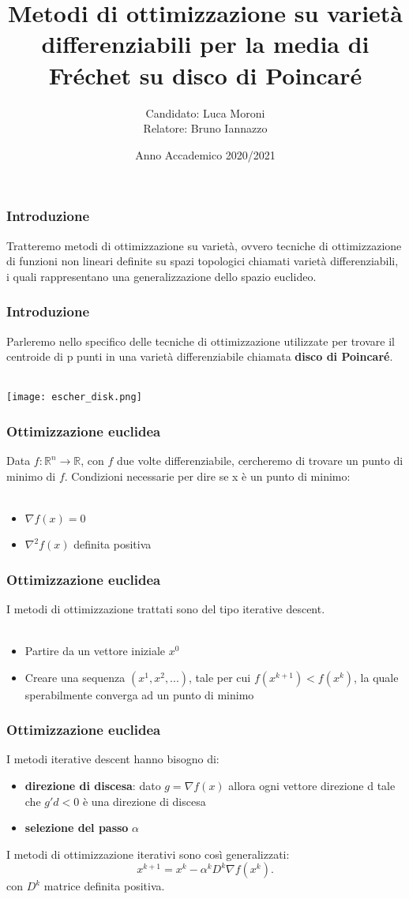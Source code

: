 \documentclass{beamer}
\title{Metodi di ottimizzazione su varietà differenziabili per la media di Fréchet su disco di Poincaré}
\author{\texorpdfstring{Candidato: Luca Moroni\\Relatore: Bruno Iannazzo}{Candidato}}
\institute{Tesi Informatica}
\date{Anno Accademico 2020/2021}
\begin{document}
\frame{\titlepage}

\begin{frame}
\frametitle{Introduzione}
Tratteremo metodi di ottimizzazione su varietà, ovvero tecniche di ottimizzazione di funzioni non lineari definite su spazi topologici chiamati varietà differenziabili, i quali rappresentano una generalizzazione dello spazio euclideo.
\end{frame}

\begin{frame}
\frametitle{Introduzione}
Parleremo nello specifico delle tecniche di ottimizzazione utilizzate per trovare il centroide di p punti in una varietà differenziabile chiamata \textbf{disco di Poincaré}.\\~\
\begin{center}
    \texttt{[image: escher\_disk.png]} 
\end{center}
\end{frame}

\begin{frame}
\frametitle{Ottimizzazione euclidea}
Data $f : \mathbb{R}^n \to \mathbb{R}$, con $f$ due volte differenziabile, cercheremo di trovare un punto di minimo di $f$.
Condizioni necessarie per dire se x è un punto di minimo:\\~\

\begin{itemize}
\item $\nabla f(x) = 0$
\item $\nabla^2 f(x)$ definita positiva
\end{itemize}
\end{frame}

\begin{frame}
\frametitle{Ottimizzazione euclidea}
I metodi di ottimizzazione trattati sono del tipo iterative descent.\\~\

\begin{itemize}
    \item Partire da un vettore iniziale $x^0$
    \item Creare una sequenza $(x^1, x^2,  ...)$, tale per cui $f(x^{k+1}) < f(x^k)$, la quale sperabilmente converga ad un punto di minimo
\end{itemize}
\end{frame}

\begin{frame}
\frametitle{Ottimizzazione euclidea}
I metodi iterative descent hanno bisogno di:
\begin{itemize}
    \item \textbf{direzione di discesa}: dato $g = \nabla f(x)$ allora ogni vettore direzione d tale che $g'd < 0$ è una direzione di discesa
    \item \textbf{selezione del passo} $\alpha$
\end{itemize}
I metodi di ottimizzazione iterativi sono così generalizzati:
\[x^{k+1} = x^k - \alpha^k D^k \nabla f(x^k).\]
con $D^k$ matrice definita positiva.
\end{frame}
\end{document}
